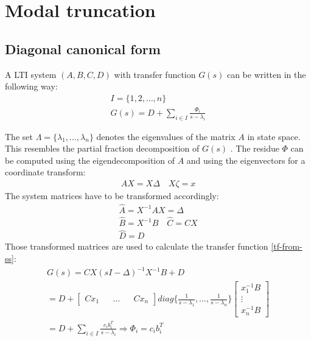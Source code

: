 \section{Modal truncation}
\subsection{Diagonal canonical form}
A LTI system \((A, B, C, D)\) with transfer function \(G(s)\) can be written in the following way:
\begin{gather}
I = \{1, 2, \hdots, n\} \\
G(s) = D + \sum_{i \in I} \frac{\Phi_i}{s-\lambda_i} \label{dcnf}
\end{gather}

The set \(\Lambda = \{\lambda_1, \hdots, \lambda_n\}\) denotes the eigenvalues of the matrix \(A\) in state space.
This resembles the partial fraction decomposition of \(G(s)\) \cite{vuillemin2020optimal}.
The residue \(\Phi\) can be computed using the eigendecomposition of \(A\) and using the eigenvectors for a coordinate transform:
\begin{gather}
AX = X\Delta \quad X \zeta =  x 
\end{gather}
The system matrices have to be transformed accordingly:
\begin{gather}
\hat{A} = X^{-1}AX = \Delta \\
\hat{B} = X^{-1}B \quad \hat{C} = CX \\
\hat{D} = D
\end{gather}
Those transformed matrices are used to calculate the transfer function \ref{tf-from-ss}:
\begin{gather}
G(s) = CX(sI - \Delta)^{-1}X^{-1}B + D\\
= D + \begin{bmatrix}
C x_1 && \hdots && Cx_n
\end{bmatrix} diag\{\frac{1}{s-\lambda_1}, \hdots, \frac{1}{s-\lambda_n}\} \begin{bmatrix}
x_1^{-1}B \\
\vdots \\
x_n^{-1}B
\end{bmatrix} \\
= D + \sum_{i \in I} \frac{c_i b_i^{T}}{s - \lambda_i} 
\Rightarrow \Phi_i = c_i b_i^{T}
\end{gather}
\cite{Benner}

